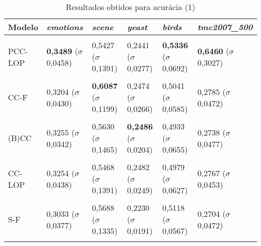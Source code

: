 
\begin{table}[htbp]
	\centering
	\caption{Resultados obtidos para acurácia (1)}
		\begin{tabular}
        { p{0.88in} p{0.88in} p{0.88in} p{0.88in} p{0.88in} p{0.88in} }
        
        \hline
Modelo & \textit{emotions} & \textit{scene} & \textit{yeast} & \textit{birds} & \textit{tmc2007\_500} \\ 
\hline \\

PCC-LOP & \textbf{0,3489} \newline ($\sigma$ 0,0458) & 0,5427 \newline ($\sigma$ 0,1391) & 0,2441 \newline ($\sigma$ 0,0277) & \textbf{0,5336} \newline ($\sigma$ 0,0692) & \textbf{0,6460} \newline ($\sigma$ 0,3027) \\ \\
CC-F & 0,3204 \newline ($\sigma$ 0,0430) & \textbf{0,6087} \newline ($\sigma$ 0,1199) & 0,2474 \newline ($\sigma$ 0,0266) & 0,5041 \newline ($\sigma$ 0,0585) & 0,2785 \newline ($\sigma$ 0,0472) \\ \\
(B)CC & 0,3255 \newline ($\sigma$ 0,0342) & 0,5630 \newline ($\sigma$ 0,1465) & \textbf{0,2486} \newline ($\sigma$ 0,0204) & 0,4933 \newline ($\sigma$ 0,0655) & 0,2738 \newline ($\sigma$ 0,0477) \\ \\
CC-LOP & 0,3254 \newline ($\sigma$ 0,0438) & 0,5468 \newline ($\sigma$ 0,1391) & 0,2482 \newline ($\sigma$ 0,0249) & 0,4979 \newline ($\sigma$ 0,0627) & 0,2767 \newline ($\sigma$ 0,0453) \\ \\
S-F & 0,3033 \newline ($\sigma$ 0,0377) & 0,5688 \newline ($\sigma$ 0,1335) & 0,2230 \newline ($\sigma$ 0,0191) & 0,5118 \newline ($\sigma$ 0,0567) & 0,2704 \newline ($\sigma$ 0,0472) \\ \\

\end{tabular}
\end{table}
